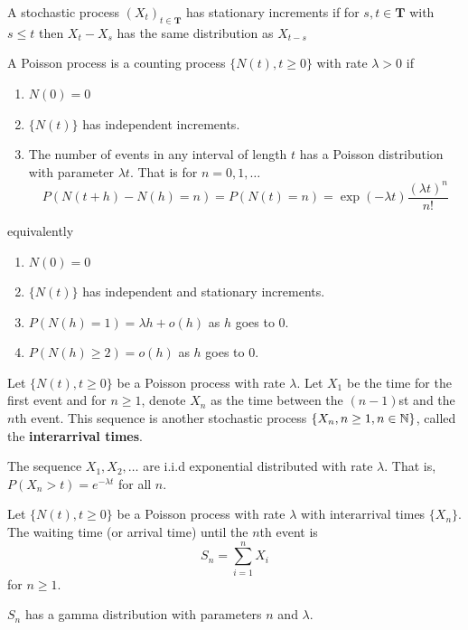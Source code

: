 \begin{defn}
A stochastic process $(X_t)_{t \in \mathbf T}$ has stationary increments if for $s,t \in \mathbf{T}$ with $s \leq t$ then $X_t - X_s$ has the same distribution as $X_{t - s}$
\end{defn}

\begin{defn} \cite{Ross_SP_95}
A Poisson process is a counting process $\{N(t), t \geq 0\}$ with rate $\lambda > 0$ if
\begin{enumerate}
    \item $N(0) = 0$
    \item $\{N(t)\}$ has independent increments.
    \item The number of events in any interval of length $t$ has a Poisson distribution with parameter $\lambda t$. That is for $n = 0,1,\ldots$
    $$
    P(N(t + h) - N(h) = n) = P(N(t) = n) = \exp(-\lambda t) \frac{(\lambda t)^n}{n!}
    $$
\end{enumerate}

equivalently

\begin{enumerate}
    \item $N(0) = 0$
    \item $\{N(t)\}$ has independent and stationary increments.
    \item $P(N(h) = 1) = \lambda h + o(h)$ as $h$ goes to 0.
    \item $P(N(h) \geq 2) = o(h)$ as $h$ goes to 0.
\end{enumerate}
\end{defn}

\begin{defn} \cite{Ross_SP_95}
Let $\{N(t), t \geq 0\}$ be a Poisson process with rate $\lambda$.
Let $X_1$ be the time for the first event and for $n \geq 1$,
denote $X_n$ as the time between the $(n - 1)$st and the $n$th event.
This sequence is another stochastic process $\{X_n, n \geq 1, n \in \mathbb{N}\}$, called the \textbf{interarrival times}.

The sequence $X_1,X_2, \ldots$ are i.i.d exponential distributed with rate $\lambda$. That is, $P(X_n > t) = e^{-\lambda t}$ for all $n$.
\end{defn}

\begin{defn} \cite{Ross_SP_95}
Let $\{N(t), t \geq 0\}$ be a Poisson process with rate $\lambda$ with interarrival times $\{X_n\}$.
The waiting time (or arrival time) until the $n$th event is 
$$
S_n  = \sum_{i = 1}^n X_i
$$
for $n \geq 1$.

$S_n$ has a gamma distribution with parameters $n$ and $\lambda$.
\end{defn}

